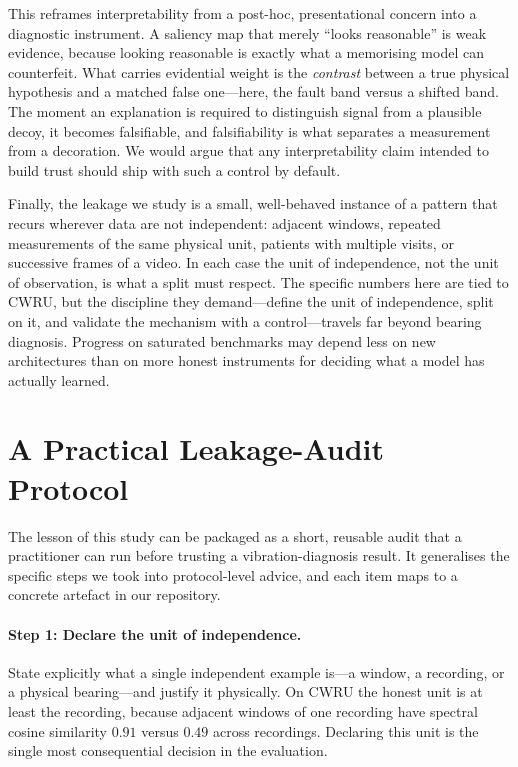 \documentclass[11pt]{article}
\begin{document}
This reframes interpretability from a post-hoc, presentational concern into a diagnostic
instrument. A saliency map that merely ``looks reasonable'' is weak evidence, because
looking reasonable is exactly what a memorising model can counterfeit. What carries
evidential weight is the \emph{contrast} between a true physical hypothesis and a matched
false one---here, the fault band versus a shifted band. The moment an explanation is
required to distinguish signal from a plausible decoy, it becomes falsifiable, and
falsifiability is what separates a measurement from a decoration. We would argue that any
interpretability claim intended to build trust should ship with such a control by default.

Finally, the leakage we study is a small, well-behaved instance of a pattern that recurs
wherever data are not independent: adjacent windows, repeated measurements of the same
physical unit, patients with multiple visits, or successive frames of a video. In each
case the unit of independence, not the unit of observation, is what a split must respect.
The specific numbers here are tied to CWRU, but the discipline they demand---define the
unit of independence, split on it, and validate the mechanism with a control---travels far
beyond bearing diagnosis. Progress on saturated benchmarks may depend less on new
architectures than on more honest instruments for deciding what a model has actually
learned.

\section{A Practical Leakage-Audit Protocol}
The lesson of this study can be packaged as a short, reusable audit that a practitioner can
run before trusting a vibration-diagnosis result. It generalises the specific steps we took
into protocol-level advice, and each item maps to a concrete artefact in our repository.

\paragraph{Step 1: Declare the unit of independence.}
State explicitly what a single independent example is---a window, a recording, or a
physical bearing---and justify it physically. On CWRU the honest unit is at least the
recording, because adjacent windows of one recording have spectral cosine similarity
$0.91$ versus $0.49$ across recordings. Declaring this unit is the single most consequential
decision in the evaluation.
\end{document}

